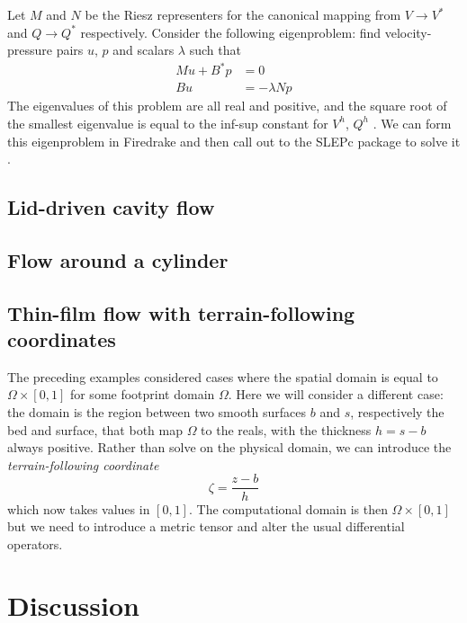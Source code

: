 \documentclass{article}
\theoremstyle{definition}
\theoremstyle{plain}
\begin{document}
Let $M$ and $N$ be the Riesz representers for the canonical mapping from $V \to V^*$ and $Q \to Q^*$ respectively.
Consider the following eigenproblem: find velocity-pressure pairs $u$, $p$ and scalars $\lambda$ such that
\begin{align}
    Mu + B^*p & = 0 \\
    Bu & = -\lambda Np
\end{align}
The eigenvalues of this problem are all real and positive, and the square root of the smallest eigenvalue is equal to the inf-sup constant for $V^h$, $Q^h$ \citep{malkus1981eigenproblems}.
We can form this eigenproblem in Firedrake and then call out to the SLEPc package to solve it \citep{hernandez2005slepc}.

\subsection{Lid-driven cavity flow}

\subsection{Flow around a cylinder}

\subsection{Thin-film flow with terrain-following coordinates}

The preceding examples considered cases where the spatial domain is equal to $\Omega \times [0, 1]$ for some footprint domain $\Omega$.
Here we will consider a different case: the domain is the region between two smooth surfaces $b$ and $s$, respectively the bed and surface, that both map $\Omega$ to the reals, with the thickness $h = s - b$ always positive.
Rather than solve on the physical domain, we can introduce the \emph{terrain-following coordinate}
\begin{equation}
    \zeta = \frac{z - b}{h}
\end{equation}
which now takes values in $[0, 1]$.
The computational domain is then $\Omega \times [0, 1]$ but we need to introduce a metric tensor and alter the usual differential operators.



\section{Discussion}

\pagebreak



\end{document}
